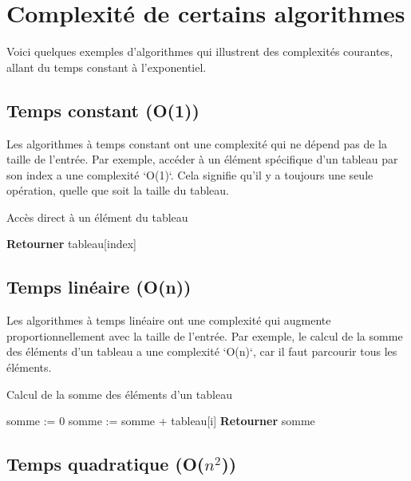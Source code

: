 \section{Complexité de certains algorithmes}
Voici quelques exemples d'algorithmes qui illustrent des complexités courantes, allant du temps constant à l'exponentiel.

\subsection{Temps constant (O(1))}

Les algorithmes à temps constant ont une complexité qui ne dépend pas de la taille de l'entrée. Par exemple, accéder à un élément spécifique d'un tableau par son index a une complexité `O(1)`. Cela signifie qu'il y a toujours une seule opération, quelle que soit la taille du tableau.

\begin{algorithm}
	\caption{Accès direct à un élément du tableau}
	\begin{algorithmic}[1]
		\State \textbf{Retourner} tableau[index]
		\EndFunction
	\end{algorithmic}
\end{algorithm}

\subsection{Temps linéaire (O(n))}

Les algorithmes à temps linéaire ont une complexité qui augmente proportionnellement avec la taille de l'entrée. Par exemple, le calcul de la somme des éléments d'un tableau a une complexité `O(n)`, car il faut parcourir tous les éléments.

\begin{algorithm}
	\caption{Calcul de la somme des éléments d'un tableau}
	\begin{algorithmic}[1]
		\State somme := 0
		\State somme := somme + tableau[i]
		\EndFor
		\State \textbf{Retourner} somme
		\EndFunction
	\end{algorithmic}
\end{algorithm}

\subsection{Temps quadratique (O($n^2$))}

